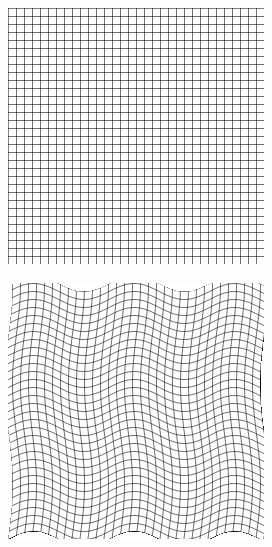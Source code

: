 \begin{figure}[H]
    \centering
	\begin{subfigure}[t]{0.3\textwidth}
	  \includegraphics[width=\textwidth]{figuras/grid.png}
	  \label{fig:grid}
	\end{subfigure}
	\begin{subfigure}[t]{0.3\textwidth}
	  \includegraphics[width=\textwidth]{figuras/gridSin.png}

\end{subfigure}
\end{figure}
